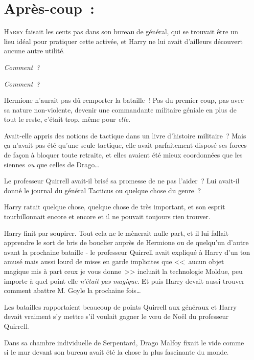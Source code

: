 
\section{Après-coup~:}

\lettrine{H}{arry} faisait les cents pas dans son bureau de général, qui se trouvait être un lieu idéal pour pratiquer cette activée, et Harry ne lui avait d'ailleurs découvert aucune autre utilité.

\emph{Comment~?}

\emph{Comment~?}

Hermione n'aurait pas dû remporter la bataille~! Pas du premier coup, pas avec sa nature non-violente, devenir une commandante militaire géniale en plus de tout le reste, c'était trop, même pour \emph{elle}.

Avait-elle appris des notions de tactique dans un livre d'histoire militaire~? Mais ça n'avait pas été qu'une seule tactique, elle avait parfaitement disposé ses forces de façon à bloquer toute retraite, et elles avaient été mieux coordonnées que les siennes \emph{ou} que celles de Drago…

Le professeur Quirrell avait-il brisé sa promesse de ne pas l'aider~? Lui avait-il donné le journal du général Tacticus ou quelque chose du genre~?

Harry ratait quelque chose, quelque chose de très important, et son esprit tourbillonnait encore et encore et il ne pouvait toujours rien trouver.

Harry finit par soupirer. Tout cela ne le mènerait nulle part, et il lui fallait apprendre le sort de bris de bouclier auprès de Hermione ou de quelqu'un d'autre avant la prochaine bataille - le professeur Quirrell avait expliqué à Harry d'un ton amusé mais aussi lourd de mises en garde implicites que <<~aucun objet magique mis à part ceux je vous donne~>> incluait la technologie Moldue, peu importe à quel point elle \emph{n'était pas magique}. Et puis Harry devait aussi trouver comment abattre M. Goyle la prochaine fois…

Les batailles rapportaient beaucoup de points Quirrell aux généraux et Harry devait vraiment s'y mettre s'il voulait gagner le vœu de Noël du professeur Quirrell.

\later

Dans sa chambre individuelle de Serpentard, Drago Malfoy fixait le vide comme si le mur devant son bureau avait été la chose la plus fascinante du monde.

